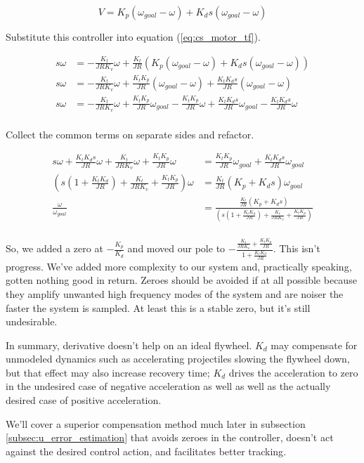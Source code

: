\begin{equation*}
  V = K_p (\omega_{goal} - \omega) + K_d s (\omega_{goal} - \omega)
\end{equation*}

Substitute this controller into equation (\ref{eq:cs_motor_tf}).

\begin{align*}
  s \omega &= -\frac{K_t}{JRK_v} \omega + \frac{K_t}{JR}
    \left(K_p (\omega_{goal} - \omega) + K_d s (\omega_{goal} - \omega)\right)
    \\
  s \omega &= -\frac{K_t}{JRK_v} \omega + \frac{K_t K_p}{JR}
    (\omega_{goal} - \omega) + \frac{K_t K_d s}{JR} (\omega_{goal} - \omega) \\
  s \omega &= -\frac{K_t}{JRK_v} \omega + \frac{K_t K_p}{JR} \omega_{goal} -
    \frac{K_t K_p}{JR} \omega + \frac{K_t K_d s}{JR} \omega_{goal} -
    \frac{K_t K_d s}{JR} \omega \\
\end{align*}

Collect the common terms on separate sides and refactor.

\begin{align*}
  s \omega + \frac{K_t K_d s}{JR} \omega + \frac{K_t}{JRK_v} \omega +
    \frac{K_t K_p}{JR} \omega &= \frac{K_t K_p}{JR} \omega_{goal} +
    \frac{K_t K_d s}{JR} \omega_{goal} \\
  \left(s \left(1 + \frac{K_t K_d}{JR}\right) + \frac{K_t}{JRK_v} +
    \frac{K_t K_p}{JR}\right) \omega &= \frac{K_t}{JR}
    \left(K_p + K_d s\right) \omega_{goal} \\
  \frac{\omega}{\omega_{goal}} &= \frac{\frac{K_t}{JR}
    \left(K_p + K_d s\right)}{\left(s \left(1 + \frac{K_t K_d}{JR}\right) +
    \frac{K_t}{JRK_v} + \frac{K_t K_p}{JR}\right)} \\
\end{align*}

So, we added a zero at $-\frac{K_p}{K_d}$ and moved our pole to
$-\frac{\frac{K_t}{JRK_v} + \frac{K_t K_p}{JR}}{1 + \frac{K_t K_d}{JR}}$. This
isn't progress. We've added more complexity to our \gls{system} and, practically
speaking, gotten nothing good in return. Zeroes should be avoided if at all
possible because they amplify unwanted high frequency modes of the \gls{system}
and are noiser the faster the \gls{system} is sampled. At least this is a stable
zero, but it's still undesirable.

In summary, derivative doesn't help on an ideal flywheel. $K_d$ may compensate
for unmodeled dynamics such as accelerating projectiles slowing the flywheel
down, but that effect may also increase recovery time; $K_d$ drives the
acceleration to zero in the undesired case of negative acceleration as well as
well as the actually desired case of positive acceleration.

We'll cover a superior compensation method much later in subsection
\ref{subsec:u_error_estimation} that avoids zeroes in the \gls{controller},
doesn't act against the desired control action, and facilitates better
\gls{tracking}.
